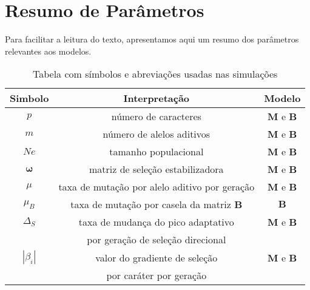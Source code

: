\section{Resumo de Parâmetros}

Para facilitar a leitura do texto, apresentamos aqui um resumo dos
parâmetros relevantes aos modelos.

\begin{table}[htbp]
    \caption[Tabela de abreviações]{Tabela com símbolos e abreviações
    usadas nas simulações}
    \label{tab:exemplo}
    \vspace{1em}
    \centering
    \begin{tabular}{c c c}
        \toprule
        Simbolo    & Interpretação & Modelo\\
        \midrule
        $p$        & número de caracteres & $\mathbf{M}$ e $\mathbf{B}$\\
        $m$        & número de alelos aditivos & $\mathbf{M}$ e $\mathbf{B}$\\
        $Ne$       & tamanho populacional & $\mathbf{M}$ e $\mathbf{B}$   \\
        $\pmb{\omega}$   & matriz de seleção estabilizadora & $\mathbf{M}$ e $\mathbf{B}$\\
        $\mu$      & taxa de mutação por alelo aditivo por geração & $\mathbf{M}$ e $\mathbf{B}$\\
        $\mu_B$    & taxa de mutação por casela da matriz $\mathbf{B}$ & $\mathbf{B}$\\
        $\Delta_S$ & taxa de mudança do pico adaptativo & $\mathbf{M}$ e $\mathbf{B}$\\
                   & por geração de seleção direcional & \\
        $|\beta_i|$& valor do gradiente de seleção        &$\mathbf{M}$ e $\mathbf{B}$\\ 
                   &   por caráter por geração            &  \\
        \bottomrule
    \end{tabular}
\end{table}
